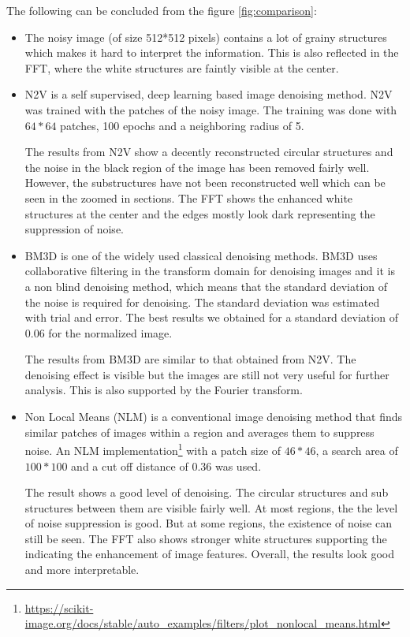 \documentclass[fleqn,10pt]{wlscirep}
\begin{document}
The following can be concluded from the figure \ref{fig:comparison}:
\begin{itemize}
	\item The noisy image (of size 512*512 pixels) contains a lot of grainy structures which makes it hard to interpret the information. This is also reflected in the FFT, where the white structures are faintly visible at the center.
	
	\item N2V\cite{krull2019noise2void} is a self supervised, deep learning based image denoising method. N2V was trained with the patches of the noisy image. The training was done with $64*64$ patches, 100 epochs and a neighboring radius of 5. 
	
	The results from N2V show a decently reconstructed circular structures and the noise in the black region of the image has been removed fairly well. However, the substructures have not been reconstructed well which can be seen in the zoomed in sections. The FFT shows the enhanced white structures at the center and the edges mostly look dark representing the suppression of noise. 
	
	\item BM3D \cite{DBLP:journals/tip/BM3D} is one of the widely used classical denoising methods. BM3D uses collaborative filtering in the transform domain for denoising images and it is a non blind denoising method, which means that the standard deviation of the noise is required for denoising. The standard deviation was estimated with trial and error. The best results we obtained for a standard deviation of 0.06 for the normalized image.
	
	The results from BM3D are similar to that obtained from N2V. The denoising effect is visible but the images are still not very useful for further analysis. This is also supported by the Fourier transform.
	
	\item Non Local Means (NLM) \cite{bcm_nlm} is a conventional image denoising method that finds similar patches of images within a region and averages them to suppress noise. An NLM implementation\footnote{\url{https://scikit-image.org/docs/stable/auto_examples/filters/plot_nonlocal_means.html}} with a patch size of $46*46$, a search area of $100*100$ and a cut off distance of 0.36 was used. 
	
	The result shows a good level of denoising. The circular structures and sub structures between them are visible fairly well. At most regions, the the level of noise suppression is good. But at some regions, the existence of noise can still be seen. The FFT also shows stronger white structures supporting the indicating the enhancement of image features. Overall, the results look good and more interpretable. 
	

\end{itemize}
\end{document}
